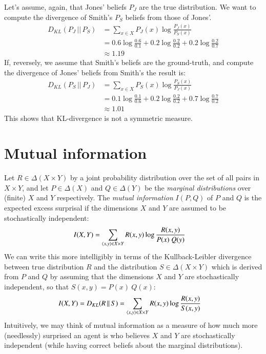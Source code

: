 \documentclass[nobib,nofonts]{tufte-handout}
\begin{document}
\begin{example}
  Let's assume, again, that Jones' beliefs $P_{J}$ are the true distribution.
  We want to compute the divergence of Smith's $P_{S}$ beliefs from those of Jones'.
  \begin{align*}
    D_{KL}(P_{J} \,||\, P_{S}) & = \sum_{x \in X} P_{J}(x) \log  \frac{P_{J}(x)}{P_{S}(x)} \\
                               & = 0.6 \log \frac{0.6}{0.1} +
                                 0.2 \log \frac{0.2}{0.2} +
                                 0.2 \log \frac{0.2}{0.7} \\
    & \approx 1.19
  \end{align*}
  If, reversely, we assume that Smith's beliefs are the ground-truth, and compute the divergence of Jones' beliefs from Smith's the result is:
  \begin{align*}
    D_{KL}(P_{S} \,||\, P_{J}) & = \sum_{x \in X} P_{S}(x) \log  \frac{P_{S}(x)}{P_{J}(x)} \\
                               & = 0.1 \log \frac{0.1}{0.6} +
                                   0.2 \log \frac{0.2}{0.2} +
                                   0.7 \log \frac{0.7}{0.2} \\
    & \approx 1.01
  \end{align*}
  This shows that KL-divergence is not a symmetric measure.
\end{example}


\section{Mutual information}

Let $R \in \Delta(X \times Y)$ by a joint probability distribution over the set of all pairs in $X \times Y$, and let $P \in \Delta(X)$ and $Q \in \Delta(Y)$ be the \emph{marginal distributions} over (finite) $X$ and $Y$ respectively.
The \emph{mutual information} $I(P,Q)$ of $P$ and $Q$ is the expected excess surprisal if the dimensions $X$ and $Y$ are assumed to be stochastically independent:
\begin{align*}
  I(X,Y) & = \sum_{\left \langle x,y\right\rangle \in X \times Y} R(x,y) \log \frac{R(x,y)}{P(x) \ Q(y)}
\end{align*}
We can write this more intelligibly in terms of the Kullback-Leibler divergence between true distribution $R$ and the distribution $S \in \Delta(X \times Y)$ which is derived from $P$ and $Q$ by assuming that the dimensions $X$ and $Y$ are stochastically independent, so that $S(x,y) = P(x) \ Q(x)$:
\begin{align*}
  I(X,Y) & =  D_{KL}(R \,||\, S) = \sum_{\left \langle x,y\right\rangle \in X \times Y} R(x,y) \log \frac{R(x,y)}{S(x,y)}
\end{align*}
Intuitively, we may think of mutual information as a measure of how much more (needlessly) surprised an agent is who believes $X$ and $Y$ are stochastically independent (while having correct beliefs about the marginal distributions).
\end{document}
